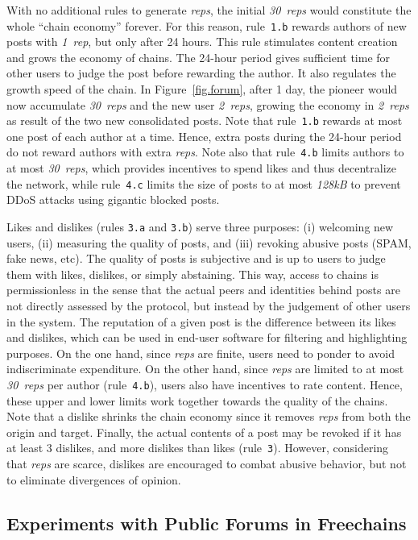 \documentclass[12pt]{article}
\newcommand{\FC}       {Freechains\xspace}
\newcommand{\reps}     {\emph{reps}\xspace}
\newcommand{\onerep}   {\emph{1~rep}\xspace}
\newcommand{\nreps}[1] {\emph{#1~reps\xspace}}
\newcommand{\code}[1]  {\texttt{\footnotesize{#1}}}
\begin{document}
With no additional rules to generate \reps, the initial \nreps{30} would
constitute the whole ``chain economy'' forever.
For this reason, rule~\code{1.b} rewards authors of new posts with \onerep,
but only after 24 hours.
This rule stimulates content creation and grows the economy of chains.
The 24-hour period gives sufficient time for other users to judge the post
before rewarding the author.
It also regulates the growth speed of the chain.
In Figure~\ref{fig.forum}, after 1 day, the pioneer would now accumulate
\nreps{30} and the new user \nreps{2}, growing the economy in \nreps{2} as
result of the two new consolidated posts.
Note that rule~\code{1.b} rewards at most one post of each author at a time.
Hence, extra posts during the 24-hour period do not reward authors with extra
\reps.
Note also that rule~\code{4.b} limits authors to at most \nreps{30}, which
provides incentives to spend likes and thus decentralize the network, while
rule~\code{4.c} limits the size of posts to at most \emph{128kB} to prevent
DDoS attacks using gigantic blocked posts.

Likes and dislikes (rules \code{3.a} and \code{3.b}) serve three purposes:
    (i) welcoming new users,
    (ii) measuring the quality of posts, and
    (iii) revoking abusive posts (SPAM, fake news, etc).
%
The quality of posts is subjective and is up to users to judge them with likes,
dislikes, or simply abstaining.
%
This way, access to chains is permissionless in the sense that the actual peers
and identities behind posts are not directly assessed by the protocol, but
instead by the judgement of other users in the system.
%
The reputation of a given post is the difference between its likes and
dislikes, which can be used in end-user software for filtering and highlighting
purposes.
%
On the one hand, since \reps are finite, users need to ponder to avoid
indiscriminate expenditure.
On the other hand, since \reps are limited to at most \nreps{30} per author
(rule~\code{4.b}), users also have incentives to rate content.
Hence, these upper and lower limits work together towards the quality of the
chains.
%
Note that a dislike shrinks the chain economy since it removes \reps from both
the origin and target.
Finally, the actual contents of a post may be revoked if it has at least 3
dislikes, and more dislikes than likes (rule~\code{3}).
However, considering that \reps are scarce, dislikes are encouraged to combat
abusive behavior, but not to eliminate divergences of opinion.

\subsection{Experiments with Public Forums in \FC}
\label{sec.evaluation}
\end{document}
